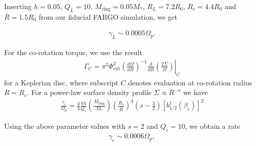 
Inserting $h=0.05$, $Q_L=10$, $M_\mathrm{ring} = 0.05M_*$,
$R_L=7.2R_0$, $R_c=4.4R_0$ and $\bar{R}=1.5R_0$ from our fiducial
FARGO simulation, we get

\begin{align}
  \gamma_L \sim 0.0005\Omega_p. 
\end{align}



For the co-rotation torque, we use the result
\begin{align}
  \Gamma_C = \left.
    \pi^2\Phi_\mathrm{ext}^2\left(\frac{d\Omega}{dR}\right)^{-1}\frac{d}{dR}\left(\frac{2\Sigma}{\Omega}\right)\right|_{C}
\end{align}
for a Keplerian disc, where subscript $C$ denotes evaluation at
co-rotation radius $R=R_c$. For a power-law surface density profile
$\Sigma\propto R^{-s}$ we have
\begin{align}
\frac{\gamma_c}{\Omega_p} = \frac{4}{3}\frac{\pi h}{Q_c}
\left(\frac{M_\mathrm{ring}}{M_*}\right)\left(\frac{R_c}{\bar{R}}\right)^4\left(s-\frac{3}{2}\right) \left[b_{1/2}^1(\beta_c)\right]^2 
\end{align}


Using the above parameter values with $s=2$ and $Q_c=10$, we obtain a
rate
\begin{align}
  \gamma_c\sim 0.0006\Omega_p,
\end{align}

